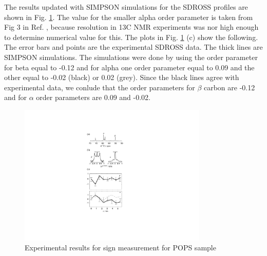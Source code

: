 \documentclass[aps,prl,superscriptaddress,twocolumn]{revtex4}
\begin{document}
The results updated with SIMPSON simulations for the SDROSS profiles
are shown in Fig. \ref{PShgSIGNSsimpson}. The value for the smaller
alpha order parameter is taken from Fig 3 in Ref. ,
because resolution in 13C NMR experiments was nor high enough to determine
numerical value for this. The plots in Fig. \ref{PShgSIGNSsimpson} (c) show
the following. The error bars and points are the experimental SDROSS data.
The thick lines are SIMPSON simulations. The simulations were done by using
the order parameter for beta equal to -0.12 and for alpha one order parameter
equal to 0.09 and the other equal to -0.02 (black) or 0.02 (grey).
Since the black lines agree with experimental data, we conlude that
the order parameters for $\beta$ carbon are -0.12 and for $\alpha$
order parameters are 0.09 and -0.02.
\begin{figure}[]
  \centering
  \includegraphics[width=9.0cm]{../Figs/PShgSIGNSsimpson.pdf}
  \caption{\label{PShgSIGNSsimpson}
    Experimental results for sign measurement for POPS sample
  }
\end{figure}
\end{document}
